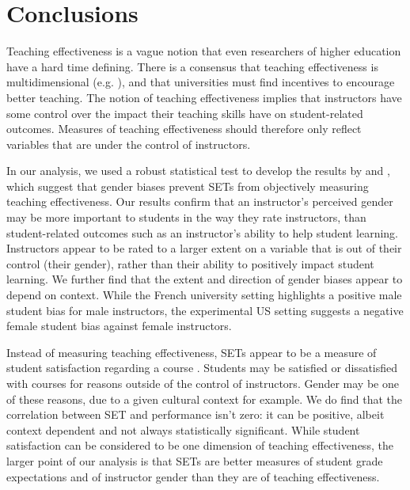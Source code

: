 \documentclass[12pt]{article}
\newcommand{\todo}[1]{{\color{red}{TO DO: \sc #1}}}
\begin{document}
\section{Conclusions}


Teaching effectiveness is a vague notion that even researchers of higher education have a hard time defining. There is a consensus that teaching effectiveness is multidimensional (e.g. \citep{Marsh1997}), and that universities must find incentives to encourage better teaching. The notion of teaching effectiveness implies that instructors have some control over the impact their teaching skills have on student-related outcomes. Measures of teaching effectiveness should therefore only reflect variables that are under the control of instructors. 

In our analysis, we used a robust statistical test to develop the results by \citet{Boring2015} and \citet{MacNell2014}, which suggest that gender biases prevent SETs from objectively measuring teaching effectiveness. Our results confirm that an instructor's perceived gender may be more important to students in the way they rate instructors, than student-related outcomes such as an instructor's ability to help student learning. Instructors appear to be rated to a larger extent on a variable that is out of their control (their gender), rather than their ability to positively impact student learning. We further find that the extent and direction of gender biases appear to depend on context. While the French university setting highlights a positive male student bias for male instructors, the experimental US setting suggests a negative female student bias against female instructors.

Instead of measuring teaching effectiveness, SETs appear to be a measure of student satisfaction regarding a course \citep{Stark2014}. Students may be satisfied or dissatisfied with courses for reasons outside of the control of instructors. Gender may be one of these reasons, due to a given cultural context for example. We do find that the correlation between SET and performance isn't zero:
it can be positive, albeit context dependent and not always statistically significant. While student satisfaction can be considered to be one dimension of teaching effectiveness, the larger point of our analysis is that SETs are better measures of student grade expectations and of instructor gender than they are of teaching effectiveness.    
\end{document}
